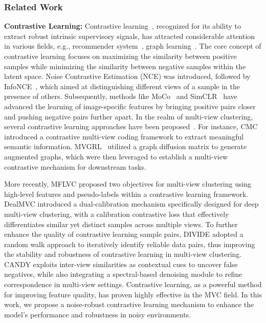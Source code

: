 \documentclass{article}
\theoremstyle{plain}
\theoremstyle{definition}
\theoremstyle{remark}
\begin{document}
\subsubsection{Related Work}

\textbf{{Contrastive Learning:}}
Contrastive learning~\cite{xihong}, recognized for its ability to extract robust intrinsic supervisory signals, has attracted considerable attention in various fields, e.g., recommender system~\cite{Darec,TTTRec,zhao1, zhao2, dang1, dang2,yin1, yin2,yang1}, graph learning~\cite{DCRN,SCGC,CCGC,MGCN,CONVERT,yu1,yu2, mo1, mo2, huang1,huang2}. The core concept of contrastive learning focuses on maximizing the similarity between positive samples while minimizing the similarity between negative samples within the latent space. Noise Contrastive Estimation (NCE) \cite{nce1,nce2} was introduced, followed by InfoNCE~\cite{infonce}, which aimed at distinguishing different views of a sample in the presence of others. Subsequently, methods like MoCo~\cite{MOCO} and SimCLR~\cite{SIMCLR} have advanced the learning of image-specific features by bringing positive pairs closer and pushing negative pairs further apart. In the realm of multi-view clustering, several contrastive learning approaches have been proposed~\cite{CMC,MVGRL,MFLVC}. For instance, CMC~\cite{CMC} introduced a contrastive multi-view coding framework to extract meaningful semantic information. MVGRL~\cite{MVGRL} utilized a graph diffusion matrix to generate augmented graphs, which were then leveraged to establish a multi-view contrastive mechanism for downstream tasks. 

More recently, MFLVC \cite{MFLVC} proposed two objectives for multi-view clustering using high-level features and pseudo-labels within a contrastive learning framework. DealMVC \cite{DealMVC} introduced a dual-calibration mechanism specifically designed for deep multi-view clustering, with a calibration contrastive loss that effectively differentiates similar yet distinct samples across multiple views. To further enhance the quality of contrastive learning sample pairs, DIVIDE \cite{DIVIDE} adopted a random walk approach to iteratively identify reliable data pairs, thus improving the stability and robustness of contrastive learning in multi-view clustering. CANDY \cite{candy} exploits inter-view similarities as contextual cues to uncover false negatives, while also integrating a spectral-based denoising module to refine correspondence in multi-view settings. Contrastive learning, as a powerful method for improving feature quality, has proven highly effective in the MVC field. In this work, we propose a noise-robust contrastive learning mechanism to enhance the model's performance and robustness in noisy environments.
\end{document}
